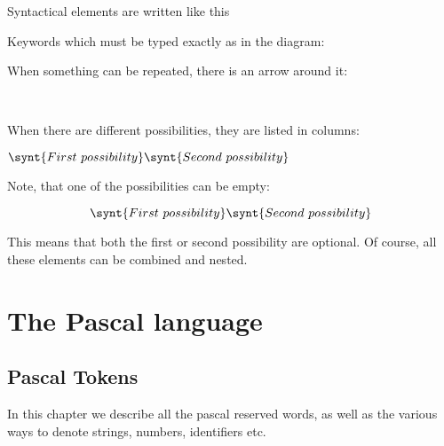 Syntactical elements are written like this
\begin{mysyntdiag}
\end{mysyntdiag}
Keywords which must be typed exactly as in the diagram:
\begin{mysyntdiag}
\end{mysyntdiag}
When something can be repeated, there is an arrow around it:
\begin{mysyntdiag}
\<[b]  \\ \>
\end{mysyntdiag}
When there are different possibilities, they are listed in columns:
\begin{mysyntdiag}
\(
\synt{First\ possibility} \\
\synt{Second\ possibility}
\)
\end{mysyntdiag}
Note, that one of the possibilities can be empty:
\begin{mysyntdiag}
\[
\synt{First\ possibility} \\
\synt{Second\ possibility}
\]
\end{mysyntdiag}
This means that both the first or second possibility are optional.
Of course, all these elements can be combined and nested.

\part{The Pascal language}


\chapter{Pascal Tokens}
In this chapter we describe all the pascal reserved words, as well as the
various ways to denote strings, numbers, identifiers etc.

